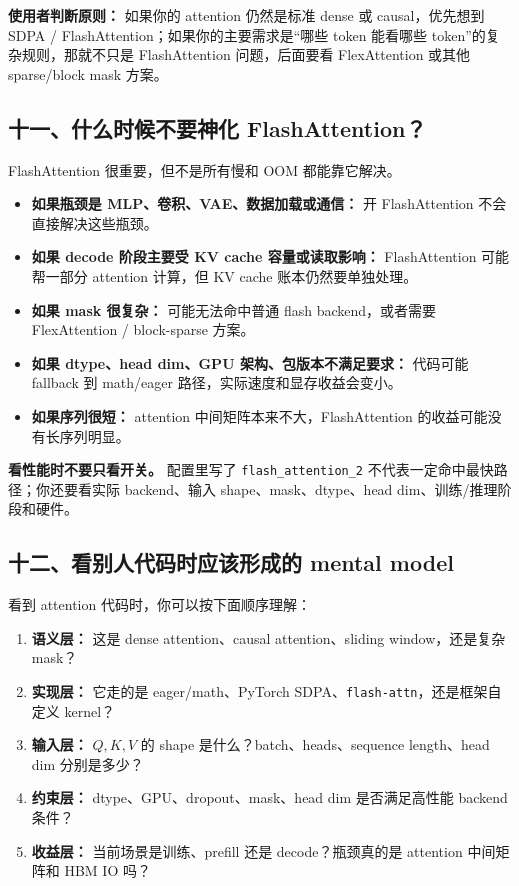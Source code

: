 \begin{summarybox}
\textbf{使用者判断原则：} 如果你的 attention 仍然是标准 dense 或 causal，优先想到 SDPA / FlashAttention；如果你的主要需求是“哪些 token 能看哪些 token”的复杂规则，那就不只是 FlashAttention 问题，后面要看 FlexAttention 或其他 sparse/block mask 方案。
\end{summarybox}

\subsection{十一、什么时候不要神化 FlashAttention？}

FlashAttention 很重要，但不是所有慢和 OOM 都能靠它解决。

\begin{itemize}[leftmargin=1.5em]
  \item \textbf{如果瓶颈是 MLP、卷积、VAE、数据加载或通信：} 开 FlashAttention 不会直接解决这些瓶颈。
  \item \textbf{如果 decode 阶段主要受 KV cache 容量或读取影响：} FlashAttention 可能帮一部分 attention 计算，但 KV cache 账本仍然要单独处理。
  \item \textbf{如果 mask 很复杂：} 可能无法命中普通 flash backend，或者需要 FlexAttention / block-sparse 方案。
  \item \textbf{如果 dtype、head dim、GPU 架构、包版本不满足要求：} 代码可能 fallback 到 math/eager 路径，实际速度和显存收益会变小。
  \item \textbf{如果序列很短：} attention 中间矩阵本来不大，FlashAttention 的收益可能没有长序列明显。
\end{itemize}

\begin{warnbox}
\textbf{看性能时不要只看开关。} 配置里写了 \texttt{flash\_attention\_2} 不代表一定命中最快路径；你还要看实际 backend、输入 shape、mask、dtype、head dim、训练/推理阶段和硬件。
\end{warnbox}

\subsection{十二、看别人代码时应该形成的 mental model}

看到 attention 代码时，你可以按下面顺序理解：

\begin{enumerate}[leftmargin=1.7em]
  \item \textbf{语义层：} 这是 dense attention、causal attention、sliding window，还是复杂 mask？
  \item \textbf{实现层：} 它走的是 eager/math、PyTorch SDPA、\texttt{flash-attn}，还是框架自定义 kernel？
  \item \textbf{输入层：} $Q,K,V$ 的 shape 是什么？batch、heads、sequence length、head dim 分别是多少？
  \item \textbf{约束层：} dtype、GPU、dropout、mask、head dim 是否满足高性能 backend 条件？
  \item \textbf{收益层：} 当前场景是训练、prefill 还是 decode？瓶颈真的是 attention 中间矩阵和 HBM IO 吗？
\end{enumerate}

